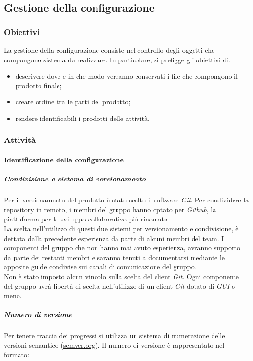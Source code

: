 \subsection{Gestione della configurazione}
\subsubsection{Obiettivi}
La gestione della configurazione consiste nel controllo degli oggetti che compongono sistema da realizzare. In particolare, si prefigge gli obiettivi di:
\begin{itemize}
	\item descrivere dove e in che modo verranno conservati i file che compongono il prodotto finale;
	\item creare ordine tra le parti del prodotto;
	\item rendere identificabili i prodotti delle attività.
\end{itemize}

\subsubsection{Attività}
\paragraph{Identificazione della configurazione}
\subparagraph*{Condivisione e sistema di versionamento\glo}
Per il versionamento del prodotto è stato scelto il software \textit{Git\glos}. Per condividere la repository in remoto, i membri del gruppo hanno optato per \textit{Github\glos}, la piattaforma per lo sviluppo collaborativo più rinomata. \\

\noindent La scelta nell'utilizzo di questi due sistemi per versionamento e condivisione, è dettata dalla precedente esperienza da parte di alcuni membri del team. I componenti del gruppo che non hanno mai avuto esperienza, avranno supporto da parte dei restanti membri e saranno tenuti a documentarsi mediante le apposite guide condivise sui canali di comunicazione del gruppo. \\

\noindent Non è stato imposto alcun vincolo sulla scelta del client \textit{Git\glos}. Ogni componente del gruppo avrà libertà di scelta nell'utilizzo di un client \textit{Git\glo} dotato di \textit{GUI\glo} o meno.

\subparagraph*{Numero di versione}
Per tenere traccia dei progressi si utilizza un sistema di numerazione delle versioni
semantico (\href{https://semver.org/lang/it/}{semver.org}).
Il numero di versione è rappresentato nel formato:\\\\

